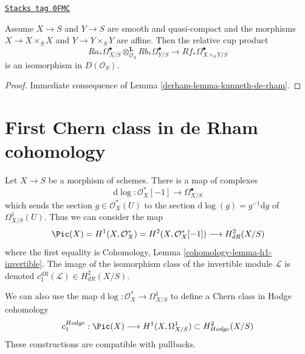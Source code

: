 \begin{lemma}
\label{derham-lemma-kunneth-de-rham-relative}
\href{https://stacks.math.columbia.edu/tag/0FMC}{\texttt{Stacks tag 0FMC}}

Assume $X \to S$ and $Y \to S$ are smooth and quasi-compact
and the morphisms $X \to X \times_S X$ and $Y \to Y \times_S Y$ are affine.
Then the relative cup product
$$
Ra_*\Omega^\bullet_{X/S}
\otimes_{\mathcal{O}_S}^\mathbf{L}
Rb_*\Omega^\bullet_{Y/S}
\longrightarrow
Rf_*\Omega^\bullet_{X \times_S Y/S}
$$
is an isomorphism in $D(\mathcal{O}_S)$.
\end{lemma}

\begin{proof}

Immediate consequence of Lemma \ref{derham-lemma-kunneth-de-rham}.
\end{proof}

\section{First Chern class in de Rham cohomology}
\label{derham-section-first-chern-class}
Let $X \to S$ be a morphism of schemes. There is a map of complexes
$$
\text{d}\log : \mathcal{O}_X^*[-1] \longrightarrow \Omega^\bullet_{X/S}
$$
which sends the section $g \in \mathcal{O}_X^*(U)$ to the section
$\text{d}\log(g) = g^{-1}\text{d}g$ of $\Omega^1_{X/S}(U)$.
Thus we can consider the map
$$
\Pic(X) = H^1(X, \mathcal{O}_X^*) =
H^2(X, \mathcal{O}_X^*[-1]) \longrightarrow H^2_{dR}(X/S)
$$
where the first equality is
Cohomology, Lemma \ref{cohomology-lemma-h1-invertible}.
The image of the isomorphism class of the invertible module
$\mathcal{L}$ is denoted $c^{dR}_1(\mathcal{L}) \in H^2_{dR}(X/S)$.

\medskip\noindent
We can also use the map $\text{d}\log : \mathcal{O}_X^* \to \Omega^1_{X/S}$
to define a Chern class in Hodge cohomology
$$
c_1^{Hodge} : \Pic(X) \longrightarrow H^1(X, \Omega^1_{X/S})
\subset H^2_{Hodge}(X/S)
$$
These constructions are compatible with pullbacks.

